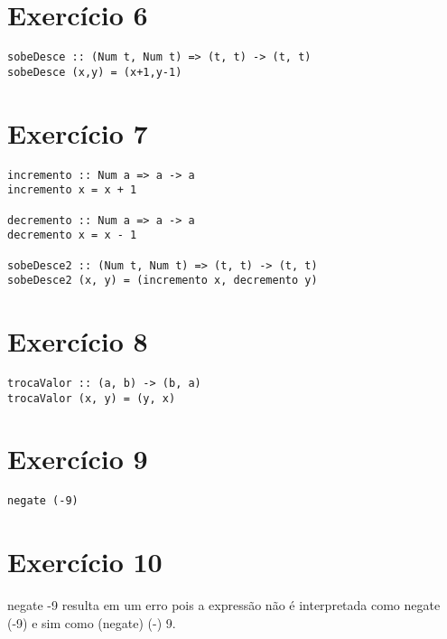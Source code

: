 \documentclass[12pt,a4paper,brazil]{article}
\begin{document}
\section*{Exercício 6}
\begin{lstlisting}
sobeDesce :: (Num t, Num t) => (t, t) -> (t, t)
sobeDesce (x,y) = (x+1,y-1)
\end{lstlisting}

\section*{Exercício 7}
\begin{lstlisting}
incremento :: Num a => a -> a
incremento x = x + 1

decremento :: Num a => a -> a
decremento x = x - 1

sobeDesce2 :: (Num t, Num t) => (t, t) -> (t, t)
sobeDesce2 (x, y) = (incremento x, decremento y)
\end{lstlisting}

\section*{Exercício 8}
\begin{lstlisting}
trocaValor :: (a, b) -> (b, a)
trocaValor (x, y) = (y, x)
\end{lstlisting}

\section*{Exercício 9}
\begin{lstlisting}
negate (-9)
\end{lstlisting}

\section*{Exercício 10}
negate -9 resulta em um erro pois a expressão não é interpretada como negate (-9) e sim como (negate) (-) 9.
\end{document}
